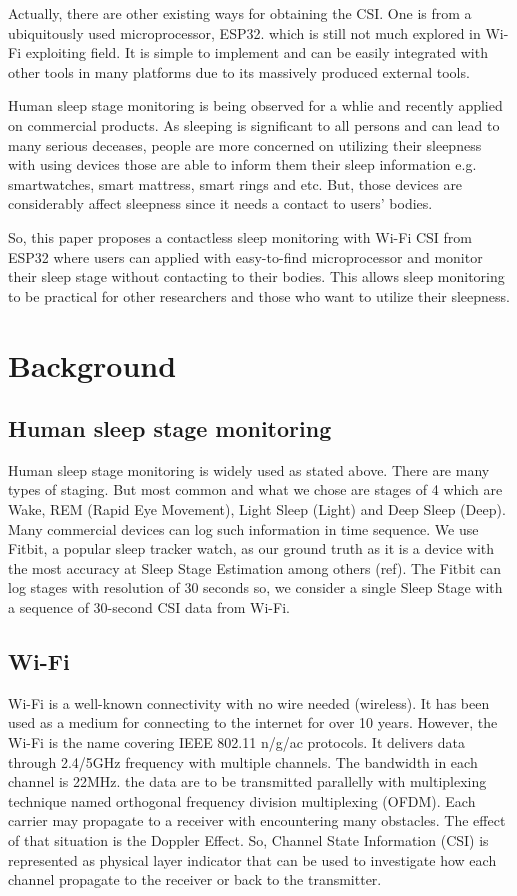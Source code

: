 \documentclass[10pt,letterpaper]{article}
\begin{document}
	Actually, there are other existing ways for obtaining the CSI. One is from a ubiquitously used microprocessor, ESP32. which is still not much explored in Wi-Fi exploiting field. It is simple to implement and can be easily integrated with other tools in many platforms due to its massively produced external tools. 
	
	
	Human sleep stage monitoring is being observed for a whlie and recently applied on commercial products. As sleeping is significant to all persons and can lead to many serious deceases, people are more concerned on utilizing their sleepness with using devices those are able to inform them their sleep information e.g. smartwatches, smart mattress, smart rings and etc.
	But, those devices are considerably affect sleepness since it needs a contact to users' bodies. 
	
	So, this paper proposes a contactless sleep monitoring with Wi-Fi CSI from ESP32 where users can applied with easy-to-find microprocessor and monitor their sleep stage without contacting to their bodies.
	This allows sleep monitoring to be practical for other researchers and those who want to utilize their sleepness.
	
	
	
	\section*{Background}
	
	\subsection*{Human sleep stage monitoring}
	Human sleep stage monitoring is widely used as stated above. There are many types of staging. But most common and what we chose are stages of 4 which are Wake, REM (Rapid Eye Movement),  Light Sleep (Light) and Deep Sleep (Deep). Many commercial devices can log such information in time sequence. We use {Fitbit}, a popular sleep tracker watch, as our ground truth as it is a device with the most accuracy at Sleep Stage Estimation among others (ref). The {Fitbit}  can log stages with resolution of 30 seconds so, we consider a single Sleep Stage with a sequence of 30-second CSI data from Wi-Fi.
	
	
	\subsection*{Wi-Fi}\label{wifi}
	
	Wi-Fi is a well-known connectivity with no wire needed (wireless). It has been used as a medium for connecting to the internet for over 10 years. However, the Wi-Fi is the name covering IEEE 802.11 n/g/ac protocols. It delivers data through 2.4/5GHz frequency with multiple channels. The bandwidth in each channel is 22MHz. the data are to be transmitted  parallelly with multiplexing technique named orthogonal frequency division multiplexing (OFDM). Each carrier may propagate to a receiver with encountering many obstacles. The effect of that situation is the Doppler Effect.
	So, Channel State Information (CSI) is represented as physical layer indicator that can be used to investigate how each channel propagate to the receiver or back to the transmitter.
	
\end{document}
